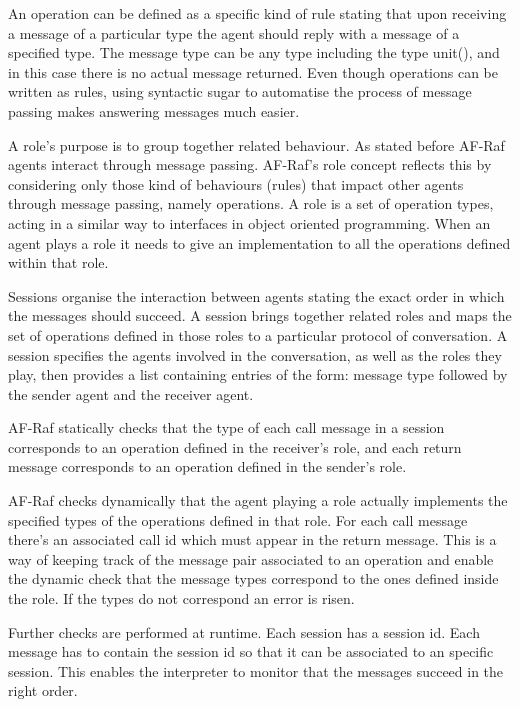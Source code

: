 \documentclass[a4paper,12pt,oneside,fleqn]{book} %
\begin{document}
An operation can be defined as a specific kind of rule stating that upon
receiving a message of a particular type the agent should reply with a
message of a specified type. The message type can be any type including the
type unit(), and in this case there is no actual message returned. Even
though operations can be written as rules, using syntactic sugar to
automatise the process of message passing makes answering messages much
easier.

A role's purpose is to group together related behaviour. As stated before
AF-Raf agents interact through message passing. AF-Raf's role concept
reflects this by considering only those kind of behaviours (rules) that
impact other agents through message passing, namely operations. A role is a
set of operation types, acting in a similar way to interfaces in object
oriented programming. When an agent plays a role it needs to give an
implementation to all the operations defined within that role.

Sessions organise the interaction between agents stating the exact order in
which the messages should succeed. A session brings together related roles
and maps the set of operations defined in those roles to a particular
protocol of conversation. A session specifies the agents involved in the
conversation, as well as the roles they play, then provides a list
containing entries of the form: message type followed by the sender agent
and the receiver agent.

AF-Raf statically checks that the type of each call message in a session
corresponds to an operation defined in the receiver's role, and each return
message corresponds to an operation defined in the sender's role.

AF-Raf checks dynamically that the agent playing a role actually implements
the specified types of the operations defined in that role.  For each call
message there's an associated call id which must appear in the return
message. This is a way of keeping track of the message pair associated to
an operation and enable the dynamic check that the message types correspond
to the ones defined inside the role. If the types do not correspond an
error is risen.

Further checks are performed at runtime. Each session has a session id.
Each message has to contain the session id so that it can be associated to
an specific session. This enables the interpreter to monitor that the
messages succeed in the right order.
\end{document}
